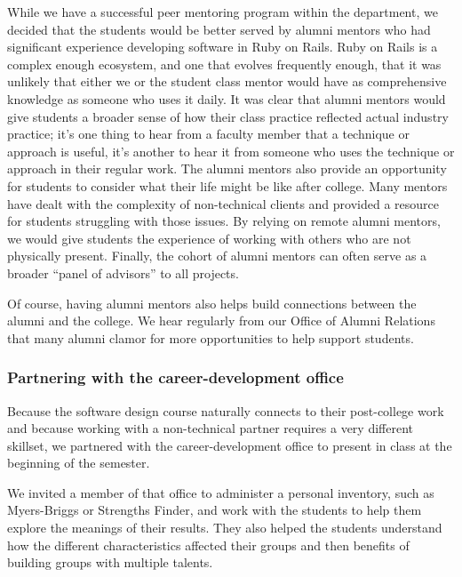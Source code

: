 While we have a successful peer mentoring program within the department,
we decided that the students would be better served by alumni mentors
who had significant experience developing software in Ruby on Rails.
Ruby on Rails is a complex enough ecosystem, and one that evolves
frequently enough, that it was unlikely that either we or the student class
mentor would have as comprehensive knowledge as someone who uses
it daily.  It was clear that alumni mentors would give students a
broader sense of how their class practice reflected actual industry
practice; it's one thing to hear from a faculty member that a
technique or approach is useful, it's another to hear it from someone
who uses the technique or approach in their regular work.  The
alumni mentors also provide an opportunity for students to consider
what their life might be like after college.  Many mentors have
dealt with the complexity of non-technical clients and provided a
resource for students struggling with those issues.  By relying on
remote alumni mentors, we would give students the experience of
working with others who are not physically present.  Finally, the
cohort of alumni mentors can often serve as a broader ``panel of
advisors'' to all projects.

Of course, having alumni mentors also helps build connections between
the alumni and the college.  We hear regularly from our Office of
Alumni Relations that many alumni clamor for more opportunities to
help support students.

\subsubsection{Partnering with the career-development office}

Because the software design course naturally connects to their
post-college work and because working with a non-technical partner
requires a very different skillset, we partnered with the 
career-development office to present in class at the beginning
of the semester. 

We invited a member of that office to administer a personal
inventory, such as Myers-Briggs or Strengths Finder, and work
with the students to help them explore the meanings of their results.
They also helped the students understand how the different
characteristics affected their groups and then benefits of building
groups with multiple talents. 

